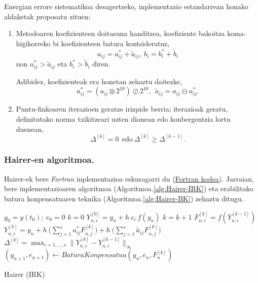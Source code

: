 Energian errore sistematikoa desagertzeko, inplementazio estandarrean honako aldaketak proposatu zituen:
\begin{enumerate}
\item Metodoaren koefizienteen doitasuna handitzea, koefiziente bakoitza koma-higikorreko bi koefizienteen batura kontsideratuz,
\begin{equation}
\label{eq:hkoef}
a_{ij}= a^{\ast}_{ij}+\tilde a_{ij}, \ b_i= b^{\ast}_i+\tilde b_i
\end{equation} 
non $a^{\ast}_{ij}>\tilde a_{ij}$ eta  $b^{\ast}_i>\tilde b_i$ diren. 

Adibidez, koefizienteak era honetan zehaztu daitezke,
\begin{equation*}
a^{\ast}_{ij}=(a_{ij} \otimes 2^{10}) \oslash 2^{10},\ \ \tilde a_{ij}= a_{ij}\ominus a^{\ast}_{ij}.
\end{equation*}

\item Puntu-finkoaren iterazioen geratze irizpide berria; iterazioak geratu, definitutako norma txikitzeari uzten dionean edo konbergentzia lortu duenean,
\begin{equation}
\label{eq:hstop}
\Delta^{[k]} = 0 \ \ \text{edo} \  \Delta^{[k]} \geqslant \Delta^{[k-1]}.
\end{equation}
  	 	
\end{enumerate}

\subsubsection*{Hairer-en algoritmoa.}

Hairer-ek bere \emph{Fortran} inplementazioa eskuragarri du (\href{http://www.unige.ch/~hairer/preprints.html}{Fortran kodea}). Jarraian, bere inplementazioaren algoritmoa (Algoritmoa.\ref{alg:Hairer-IRK}) eta erabilitako batura konpensatuaren teknika (Algoritmoa.\ref{alg:Hairer-BK}) zehaztu ditugu.
 
\begin{algorithm}[h!]
 \BlankLine
  $y_0=y(t_0); \ e_0=0$\;
  {
   \BlankLine
   $k=0$\;
   $Y_{n,i}^{[0]}=y_n+h \ c_i \ f(y_n) $\; 
   \BlankLine
   {
    \BlankLine 
    $k=k+1$\;
    $F_{n,i}^{[k]}=f(Y_{n,i}^{[k-1]}) $\;
    $Y_{n,i}^{[k]}=y_n+ h \ \big(\sum\limits_{j=1}^{s} a^{\ast}_{ij} F_{n,j}^{[k]} \big) 
                          + h \ \big(\sum\limits_{j=1}^{s} \tilde a_{ij} F_{n,j}^{[k]} \big)$\; 
    $\Delta ^{[k]} = \max_{i=1,\dots,s}\|Y_{n,i}^{[k]}-Y_{n,i}^{[k-1]}\|_{\infty}$\;
   }
   \BlankLine
   $(y_{n+1},e_{n+1})\leftarrow BaturaKonpensatua(y_n,e_n,F_n^{[k]})$\;      
   \BlankLine
 }
 \caption{Hairer (IRK)}
 \label{alg:Hairer-IRK}
\end{algorithm}


